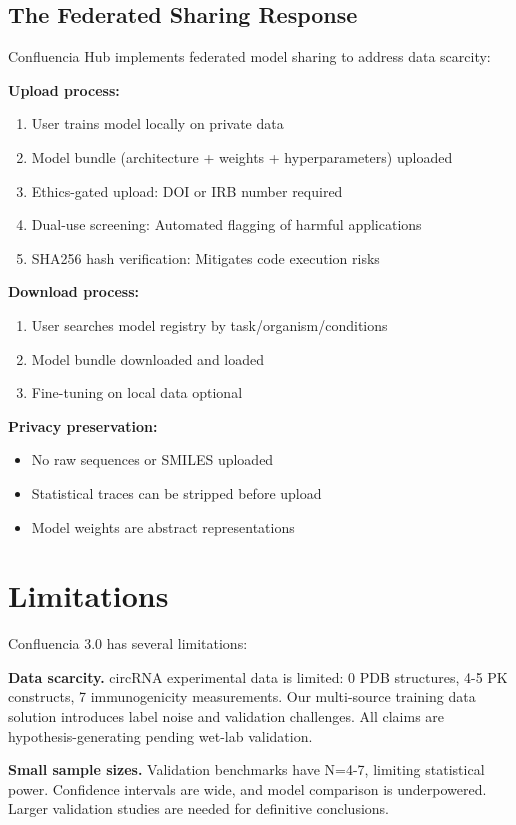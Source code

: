 \documentclass[12pt]{article}
\begin{document}
\subsection{The Federated Sharing Response}

Confluencia Hub implements federated model sharing to address data scarcity:

\textbf{Upload process:}
\begin{enumerate}
\item User trains model locally on private data
\item Model bundle (architecture + weights + hyperparameters) uploaded
\item Ethics-gated upload: DOI or IRB number required
\item Dual-use screening: Automated flagging of harmful applications
\item SHA256 hash verification: Mitigates code execution risks
\end{enumerate}

\textbf{Download process:}
\begin{enumerate}
\item User searches model registry by task/organism/conditions
\item Model bundle downloaded and loaded
\item Fine-tuning on local data optional
\end{enumerate}

\textbf{Privacy preservation:}
\begin{itemize}
\item No raw sequences or SMILES uploaded
\item Statistical traces can be stripped before upload
\item Model weights are abstract representations
\end{itemize}

\section{Limitations}

Confluencia 3.0 has several limitations:

\textbf{Data scarcity.} circRNA experimental data is limited: 0 PDB structures, 4-5 PK constructs, 7 immunogenicity measurements. Our multi-source training data solution introduces label noise and validation challenges. All claims are hypothesis-generating pending wet-lab validation.

\textbf{Small sample sizes.} Validation benchmarks have N=4-7, limiting statistical power. Confidence intervals are wide, and model comparison is underpowered. Larger validation studies are needed for definitive conclusions.
\end{document}
